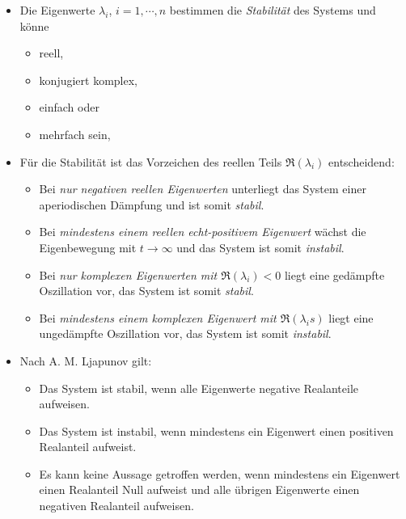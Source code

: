             \begin{itemize}
            	\item Die Eigenwerte \( \lambda _ i \), \( i = 1, \cdots, n \) bestimmen die \textit{Stabilität} des Systems und könne
                	\begin{itemize}
                		\item reell,
                		\item konjugiert komplex,
                		\item einfach oder
                		\item mehrfach sein,
                	\end{itemize}
                \item Für die Stabilität ist das Vorzeichen des reellen Teils \( \Re(\lambda _ i) \) entscheidend:
	                \begin{itemize}
	                	\item Bei \textit{nur negativen reellen Eigenwerten} unterliegt das System einer aperiodischen Dämpfung und ist somit \textit{stabil}.
	                	\item Bei \textit{mindestens einem reellen echt-positivem Eigenwert} wächst die Eigenbewegung mit \( t \rightarrow \infty \) und das System ist somit \textit{instabil}.
	                	\item Bei \textit{nur komplexen Eigenwerten mit \( \Re(\lambda _ i) < 0 \)} liegt eine gedämpfte Oszillation vor, das System ist somit \textit{stabil}.
	                	\item Bei \textit{mindestens einem komplexen Eigenwert mit \( \Re(\lambda _ is) \)} liegt eine ungedämpfte Oszillation vor, das System ist somit \textit{instabil}.
	                \end{itemize}
	            \item Nach A. M. Ljapunov gilt:
		            \begin{itemize}
		            	\item Das System ist stabil, wenn alle Eigenwerte negative Realanteile aufweisen.
		            	\item Das System ist instabil, wenn mindestens ein Eigenwert einen positiven Realanteil aufweist.
		            	\item Es kann keine Aussage getroffen werden, wenn mindestens ein Eigenwert einen Realanteil Null aufweist und alle übrigen Eigenwerte einen negativen Realanteil aufweisen.
		            \end{itemize}
            \end{itemize}
        
